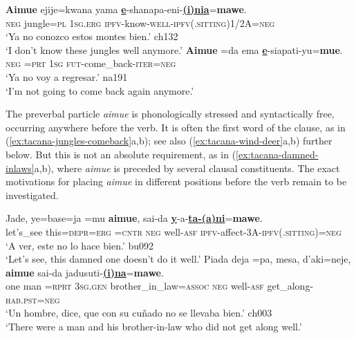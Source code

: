 \documentclass[output=paper]{langsci/langscibook}
\begin{document}
\begin{exe}\ex
\label{ex:tacana-jungles-comeback}      
\begin{xlist}
\ex\label{ex:tacana-jungles}  
\gll \textbf{Aimue} ejije=kwana yama \textbf{\underline{e}}-shanapa-eni-\textbf{\underline{(i)nia}}=\textbf{mawe}.\\
    \textsc{neg}  jungle=\textsc{pl}  \textsc{1sg.erg}
    \textsc{ipfv}-know-\textsc{well-ipfv(.sitting)}1/2A=\textsc{neg}\\
\glt `Ya no conozco estos montes bien.' ch132\\
`I don't know these jungles well anymore.'
\ex\label{ex:tacana-comeback}
\gll  \textbf{Aimue}  =da ema \textbf{\underline{e}}-siapati-yu=\textbf{mue}.\\
    \textsc{neg}  \textsc{=prt}  \textsc{1sg}
    \textsc{fut}-come\_back-\textsc{iter=neg}\\
\glt `Ya no voy a regresar.' na191\\
`I'm not going to come back again anymore.'
\end{xlist}\end{exe}

The preverbal particle \textit{aimue} is phonologically stressed and
syntactically free, occurring anywhere before the verb. It is often
the first word of the clause, as in (\ref{ex:tacana-jungles-comeback}a,b); see also (\ref{ex:tacana-wind-deer}a,b) further below. But this is not an
absolute requirement, as in (\ref{ex:tacana-damned-inlaws}a,b), where \textit{aimue} is
preceded by several clausal constituents. The exact motivations for placing
\textit{aimue} in different positions before the verb remain to be
investigated.

\begin{exe}\ex\label{ex:tacana-damned-inlaws}      
\begin{xlist}
\ex\label{ex:tacana-damned}
\gll  Jade, ye=base=ja{\cb}  =mu  \textbf{aimue},  sai-da
 \textbf{\underline{y}}-a-\textbf{\underline{ta-(a)ni}}=\textbf{mawe}.\\
    let's\_see  this=\textsc{depr}=\textsc{erg}  \textsc{=cntr}
    \textsc{neg}  well-\textsc{asf}
    \textsc{ipfv-}affect-3A-\textsc{ipfv(.sitting)=neg}\\
\glt `A ver, este no lo hace bien.' bu092\\
`Let's see, this damned one doesn't do it well.'
\ex\label{ex:tacana-inlaws}
\gll {}Piada deja{\cb} =pa,
{\ob}mesa,  d'aki=neje{\cb},  \textbf{aimue} sai-da
jadusuti-\textbf{\underline{(i)na}}=\textbf{mawe}.\\
one  man  =\textsc{rprt}  \textsc{3sg.gen}
    brother\_in\_law=\textsc{assoc}  \textsc{neg}  well-\textsc{asf}
    get\_along-\textsc{hab.pst=neg}\\
\glt `Un hombre, dice, que con su cuñado no se llevaba bien.' ch003\\
`There were a man and his brother-in-law who did not get along well.'
\end{xlist}\end{exe}
\end{document}
